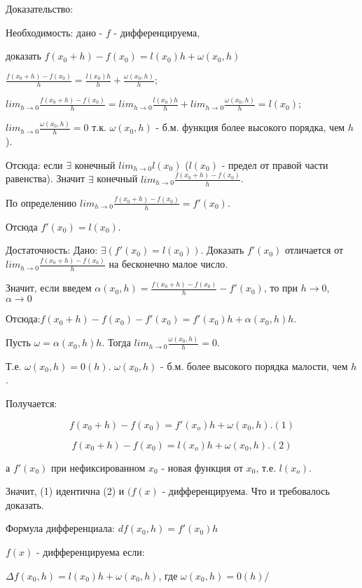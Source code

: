 Доказательство:

Необходимость: дано - $f$ - дифференцируема, 

доказать $f(x_0 + h) - f(x_0) = l(x_0)h +	\omega(x_0, h)$

$\frac {f(x_0 + h) - f(x_0)}{h} = \frac {l(x_0)h}{h} + \frac {\omega(x_0, h)}{h}$;

$lim_{h \to 0}\frac {f(x_0 + h) - f(x_0)}{h} = lim_{h \to 0}\frac {l(x_0)h}{h} + lim_{h \to 0}\frac {\omega(x_0, h)}{h} = l(x_0)$;	

$lim_{h \to 0}\frac {\omega(x_0, h)}{h} = 0$ т.к. $\omega(x_0, h)$ - б.м. функция более высокого порядка, чем $h$).

Отсюда: если $\exists$ конечный $lim_{h \to 0} l(x_0)$ ($l(x_0)$ - предел от правой части равенства). Значит $\exists$ конечный $lim_{h \to 0} \frac {f(x_0 +h) - f(x_0)}{h}$.

По определению $lim_{h \to 0} \frac {f(x_0 +h) - f(x_0)}{h} = f'(x_0)$.

Отсюда $f'(x_0) = l(x_0)$.

Достаточность: Дано: $\exists (f'(x_0) = l(x_0))$. Доказать $f'(x_0)$ отличается от $lim_{h \to 0} \frac {f(x_0 +h) - f(x_0)}{h}$ на бесконечно малое число. 

Значит, если введем $\alpha(x_0, h) = \frac {f(x_0 +h) - f(x_0)}{h} - f'(x_0)$, то при $h \to 0$, $\alpha \to 0$ 

Отсюда:$f(x_0 +h) - f(x_0) - f'(x_0) = f'(x_0)h + \alpha(x_0,h)h$.

Пусть $\omega = \alpha(x_0, h)h$. Тогда $lim_{h \to 0}\frac {\omega(x_0, h)}{h} = 0$.

Т.е. $\omega(x_0, h) = 0(h)$. $\omega(x_0, h)$ - б.м. более высокого порядка малости, чем $h$.

Получается: 

$$f(x_0 +h) - f(x_0) = f'(x_o)h + \omega(x_0,h).      (1)$$

\opred

$$f(x_0 +h) - f(x_0) = l(x_o)h + \omega(x_0,h).       (2) $$

а $f'(x_0)$ при нефиксированном $x_0$ - новая функция от $x_0$, т.е. $l(x_o)$.

Значит, (1) идентична (2) и $(f(x)$ - дифференцируема. Что и требовалось доказать.

Формула дифференциала: $df(x_0, h)=f'(x_0)h$

$f(x)$ - дифференцируема если:

$\Delta f(x_0,h) = l(x_0)h + \omega(x_0, h)$, где $\omega(x_0, h) = 0(h)$/

